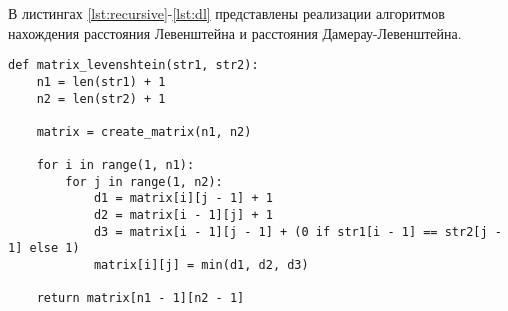 В листингах \ref{lst:recursive}-\ref{lst:dl} представлены реализации алгоритмов нахождения расстояния Левенштейна и расстояния Дамерау-Левенштейна.
\clearpage
\begin{center}
\captionsetup{justification=raggedright,singlelinecheck=off}
\begin{lstlisting}[label=lst:recursive,caption=Матричный алгоритм нахождения расстояния Левенштейна]
def matrix_levenshtein(str1, str2):
	n1 = len(str1) + 1
	n2 = len(str2) + 1
	
	matrix = create_matrix(n1, n2)
	
	for i in range(1, n1):
		for j in range(1, n2):
			d1 = matrix[i][j - 1] + 1
			d2 = matrix[i - 1][j] + 1
			d3 = matrix[i - 1][j - 1] + (0 if str1[i - 1] == str2[j - 1] else 1)
			matrix[i][j] = min(d1, d2, d3)
	
	return matrix[n1 - 1][n2 - 1]

\end{lstlisting} 
\end{center}

